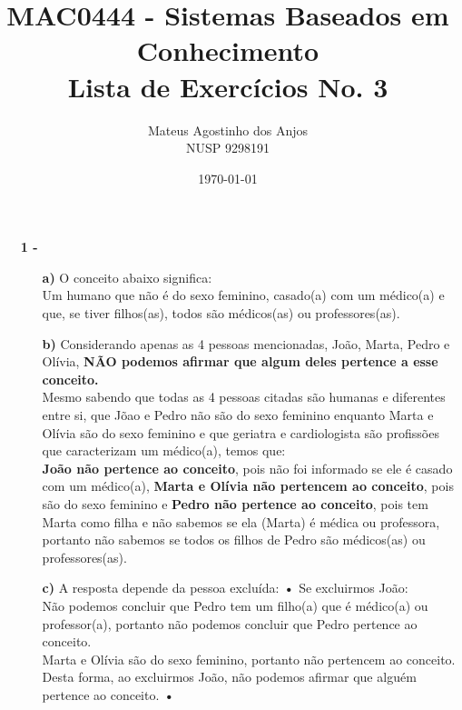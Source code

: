 \documentclass[12pt]{article}
\title{MAC0444 - Sistemas Baseados em Conhecimento \\
Lista de Exercícios No. 3
}
\author{Mateus Agostinho dos Anjos\\NUSP 9298191}
\date{\today}
\begin{document}
	\maketitle
	\begin{itemize}
		\item[\textbf{1 -}]
			\hfill\newline
			\begin{itemize}
				\item[\textbf{a) }]
					\hfill\newline
					O conceito abaixo significa:\\
					Um humano que não é do sexo feminino, casado(a) com um médico(a) e que,
					se tiver filhos(as), todos são médicos(as) ou professores(as). 
				\item[\textbf{b) }]
					\hfill\newline
					Considerando apenas as 4 pessoas mencionadas, João, Marta, Pedro
					e Olívia, \textbf{NÃO podemos afirmar que algum deles pertence a esse conceito.}\\
					Mesmo sabendo que todas as 4 pessoas citadas são humanas e diferentes entre si,
					que Jõao e Pedro não são do sexo feminino enquanto Marta e Olívia são do sexo feminino
					e que geriatra e cardiologista são profissões que caracterizam um médico(a),
					temos que:\\ 
					\textbf{João não pertence ao conceito}, pois não foi informado se ele é casado com
					um médico(a), \textbf{Marta e Olívia não pertencem ao conceito}, pois são do sexo
					feminino e \textbf{Pedro não pertence ao conceito}, pois tem Marta como filha e não
					sabemos se ela (Marta) é médica ou professora,
					portanto não sabemos se todos os filhos de Pedro são médicos(as) ou professores(as).
					\newpage
				\item[\textbf{c) }]
					\hfill\newline
					A resposta depende da pessoa excluída:
					\newline
					\subitem\textbf{•}
					Se excluirmos João:\\
					Não podemos concluir que Pedro tem um filho(a) que é médico(a) ou
					professor(a), portanto não podemos concluir que Pedro pertence ao conceito.\\
					Marta e Olívia são do sexo feminino, portanto não pertencem ao conceito.\\
					Desta forma, ao excluirmos João, não podemos afirmar que alguém pertence ao
					conceito.
					\newline
					\subitem\textbf{•}

\end{itemize}
\end{itemize}
\end{document}
